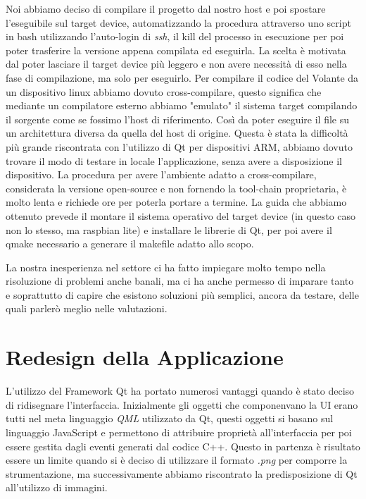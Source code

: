 Noi abbiamo deciso di compilare il progetto dal nostro host e poi spostare l'eseguibile sul target device, automatizzando la procedura attraverso 
uno script in bash utilizzando l'auto-login di \emph{ssh}, il kill del processo in esecuzione per poi poter trasferire la versione appena compilata ed eseguirla.
La scelta è motivata dal poter lasciare il target device più leggero e non avere necessità di esso nella fase di compilazione, ma solo per eseguirlo.
Per compilare il codice del Volante da un dispositivo linux abbiamo dovuto cross-compilare, 
questo significa che mediante un compilatore esterno abbiamo "emulato" il sistema target compilando il sorgente 
come se fossimo l'host di riferimento. Così da poter eseguire il file su un architettura diversa da quella del host di origine.
Questa è stata la difficoltà più grande riscontrata con l'utilizzo di Qt per dispositivi ARM, abbiamo dovuto trovare il modo di testare 
in locale l'applicazione, senza avere a disposizione il dispositivo. 
La procedura per avere l'ambiente adatto a cross-compilare, considerata la versione open-source e
non fornendo la tool-chain proprietaria, è molto lenta e richiede ore per poterla portare a termine.
La guida che abbiamo ottenuto prevede il montare il sistema operativo del target device (in questo caso non lo stesso, ma raspbian lite) 
e installare le librerie di Qt, per poi avere il qmake necessario a generare il makefile adatto allo scopo.


La nostra inesperienza nel settore ci ha fatto impiegare molto tempo nella risoluzione 
di problemi anche banali, ma ci ha anche permesso di imparare tanto e soprattutto di capire
che esistono soluzioni più semplici, ancora da testare, delle quali parlerò meglio nelle valutazioni.

\section{Redesign della Applicazione}


L'utilizzo del Framework Qt ha portato numerosi vantaggi quando è stato deciso di ridisegnare l'interfaccia.
Inizialmente gli oggetti che componenvano la UI erano tutti nel meta linguaggio \emph{QML} utilizzato da Qt, questi oggetti si basano 
sul linguaggio JavaScript e permettono di attribuire proprietà all'interfaccia per poi essere gestita dagli eventi generati dal codice C++.
Questo in partenza è risultato essere un limite quando si è deciso di utilizzare il formato \emph{.png} per comporre la strumentazione, 
ma successivamente abbiamo riscontrato la predisposizione di Qt all'utilizzo di immagini.

